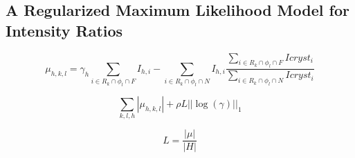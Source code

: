 \documentclass{report}
\begin{document}
\subsection{A Regularized Maximum Likelihood Model for Intensity Ratios}

\begin{equation}\label{eq:reflection_error}
\mu_{h,k,l} = \gamma_h \sum_{i\in R_k \cap \phi_l \cap F} I_{h,i} - \sum_{i\in R_k \cap \phi_l \cap N} I_{h,i} \frac {\sum_{i \in R_k \cap \phi_l \cap F} Icryst_i} {\sum_{i \in R_k \cap \phi_l \cap N} Icryst_i}
\end{equation}

\begin{equation}
\sum_{k,l,h} | \mu _{h,k,l} | + \rho L ||\log(\gamma)||_1
\end{equation}

\begin{equation}
L = \frac {|\mu|} {|H|}
\end{equation}




\end{document}
